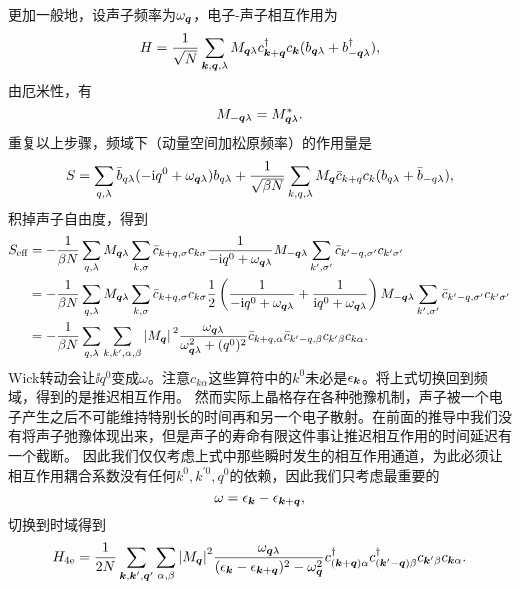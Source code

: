 更加一般地，设声子频率为$\omega_{\vb*{q}}$，电子-声子相互作用为
\begin{equation}
    H = \frac{1}{\sqrt{N}} \sum_{\vb*{k}, \vb*{q}, \lambda} M_{\vb*{q} \lambda} c^\dagger_{\vb*{k} + \vb*{q}} c_{\vb*{k}} (b_{\vb*{q} \lambda} + b_{-\vb*{q} \lambda}^\dagger),
\end{equation}
由厄米性，有
\begin{equation}
    M_{-\vb*{q} \lambda} = M^*_{\vb*{q} \lambda}.
\end{equation}
重复以上步骤，频域下（动量空间加松原频率）的作用量是
\begin{equation}
    S = \sum_{q, \lambda} \bar{b}_{q \lambda} (- \mathrm{i} q^0 + \omega_{\vb*{q} \lambda}) b_{q \lambda} + \frac{1}{\sqrt{\beta N}} \sum_{k, q, \lambda} M_{\vb*{q}} \bar{c}_{k + q} c_{k} (b_{q \lambda} + \bar{b}_{- q \lambda}),
\end{equation}
积掉声子自由度，得到
\[
    \begin{aligned}
        S_\text{eff} &= - \frac{1}{\beta N} \sum_{q, \lambda} M_{\vb*{q} \lambda} \sum_{k, \sigma} \bar{c}_{k+q, \sigma} c_{k \sigma} \frac{1}{- \mathrm{i} q^0 + \omega_{\vb*{q} \lambda}} M_{- \vb*{q} \lambda} \sum_{k', \sigma'} \bar{c}_{k' - q, \sigma'} c_{k' \sigma'} \\
        &= - \frac{1}{\beta N} \sum_{q, \lambda} M_{\vb*{q} \lambda} \sum_{k, \sigma} \bar{c}_{k+q, \sigma} c_{k \sigma} \frac{1}{2} \left( \frac{1}{- \mathrm{i} q^0 + \omega_{\vb*{q} \lambda}} + \frac{1}{\mathrm{i} q^0 + \omega_{\vb*{q} \lambda}} \right) M_{- \vb*{q} \lambda} \sum_{k', \sigma'} \bar{c}_{k' - q, \sigma'} c_{k' \sigma'} \\
        &= - \frac{1}{\beta N} \sum_{q, \lambda} \sum_{k, k', \alpha, \beta} \abs*{M_{\vb*{q}}}^2 \frac{\omega_{\vb*{q} \lambda}}{\omega_{\vb*{q} \lambda}^2 + (q^0)^2} \bar{c}_{k + q, \alpha} \bar{c}_{k' - q, \beta} c_{k' \beta} c_{k \alpha}.
    \end{aligned}
\]
Wick转动会让$\ii q^0$变成$\omega$。注意$c_{k \alpha}$这些算符中的$k^0$未必是$\epsilon_{\vb*{k}}$。将上式切换回到频域，得到的是推迟相互作用。
然而实际上晶格存在各种弛豫机制，声子被一个电子产生之后不可能维持特别长的时间再和另一个电子散射。在前面的推导中我们没有将声子弛豫体现出来，但是声子的寿命有限这件事让推迟相互作用的时间延迟有一个截断。
因此我们仅仅考虑上式中那些瞬时发生的相互作用通道，为此必须让相互作用耦合系数没有任何$k^0, k^{'0}, q^0$的依赖，因此我们只考虑最重要的
\begin{equation}
    \omega = \epsilon_{\vb*{k}} - \epsilon_{\vb*{k}+\vb*{q}},
\end{equation}
切换到时域得到
\begin{equation}
    {H}_{4\text{e}} = \frac{1}{2N} \sum_{\vb*{k}, \vb*{k}', \vb*{q}'} \sum_{\alpha, \beta} \abs{M_{\vb*{q}}}^2 \frac{\omega_{\vb*{q} \lambda}}{(\epsilon_{\vb*{k}} - \epsilon_{\vb*{k}+\vb*{q}})^2 - \omega_{\vb*{q}}^2} {c}^\dagger_{(\vb*{k}+\vb*{q}) \alpha} {c}^\dagger_{(\vb*{k}'-\vb*{q}) \beta} {c}_{\vb*{k}' \beta} {c}_{\vb*{k} \alpha}.
    \label{eq:4-electron-interaction-by-phonon}
\end{equation}

